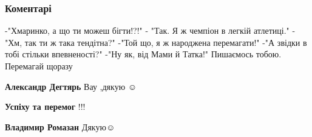  
 
 
 
 
\subsubsection{Коментарі}
\label{sec:17_06_2021.fb.maguchih_jaroslava.1.chempionat_ukrainy.cmt}

\begin{itemize}
 

\obeycr
-"Хмаринко, а що ти можеш бігти!?!"
- "Так. Я ж чемпіон в легкій атлетиці."
-"Хм, так ти ж така тендітна?"
-"Той що, я ж народжена перемагати!"
-"А звідки в тобі стільки впевненості?"
-"Ну як, від Мами й Татка!"
Пишаємось тобою. Перемагай щоразу🥰🥰🥰
\restorecr

 
\textbf{Александр Дегтярь} Вау ,дякую ☺️

 
\textbf{Успіху та перемог} !!!👋💯


 
\textbf{Владимир Ромазан} Дякую☺️

 

\end{itemize}

